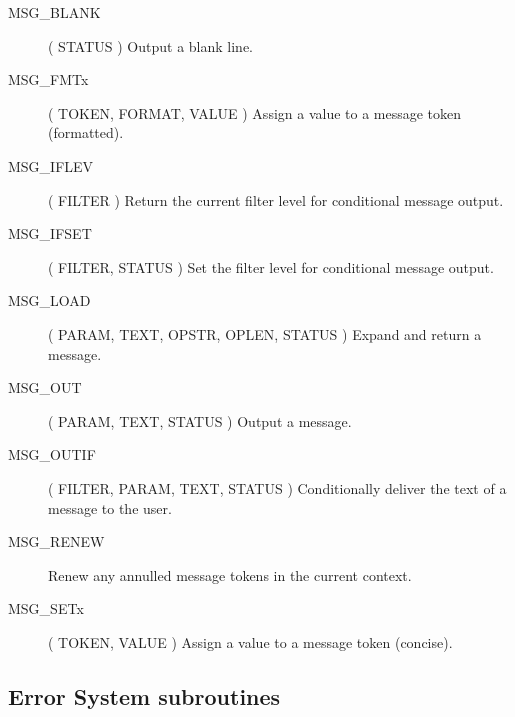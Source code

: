 \begin {description} 
\item [MSG\_BLANK] ( STATUS ) 
\subitem Output a blank line.
\indexspace 
\item [MSG\_FMTx] ( TOKEN, FORMAT, VALUE ) 
\subitem Assign a value to a message token (formatted).
\indexspace 
\item [MSG\_IFLEV] ( FILTER ) 
\subitem Return the current filter level for conditional message output.
\indexspace 
\item [MSG\_IFSET] ( FILTER, STATUS ) 
\subitem Set the filter level for conditional message output.
\indexspace 
\item [MSG\_LOAD] ( PARAM, TEXT, OPSTR, OPLEN, STATUS ) 
\subitem Expand and return a message. 
\indexspace 
\item [MSG\_OUT] ( PARAM, TEXT, STATUS ) 
\subitem Output a message. 
\indexspace 
\item [MSG\_OUTIF] ( FILTER, PARAM, TEXT, STATUS ) 
\subitem Conditionally deliver the text of a message to the user.
\indexspace 
\item [MSG\_RENEW] \hfill
\subitem Renew any annulled message tokens in the current context.
\indexspace 
\item [MSG\_SETx] ( TOKEN, VALUE ) 
\subitem Assign a value to a message token (concise).
\end {description}


\subsection {Error System subroutines}

